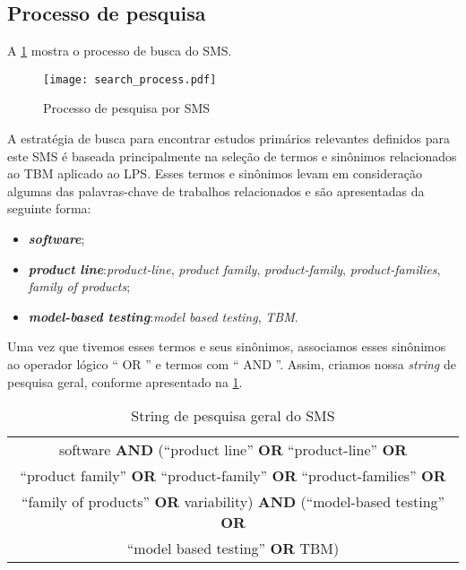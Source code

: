 \subsection{Processo de pesquisa}
\label{sec:search_process}

A \ref{fig:search_process} mostra o processo de busca do SMS.

\begin{figure} [! ht]
	\centering
	\texttt{[image: search\_process.pdf]}
	\caption{Processo de pesquisa por SMS}
	\label{fig:search_process}
\end{figure}

A estratégia de busca para encontrar estudos primários relevantes definidos para este SMS é baseada principalmente na seleção de termos e sinônimos relacionados ao TBM aplicado ao LPS. Esses termos e sinônimos levam em consideração algumas das palavras-chave de trabalhos relacionados e são apresentadas da seguinte forma:

\begin{itemize}
	\item \textbf{\textit{software}};
	\item \textbf{\textit{product line}}:\textit{product-line}, \textit{product family}, \textit{product-family}, \textit{product-families}, \textit{family of products};
	\item \textbf{\textit{model-based testing}}:\textit{model based testing}, \textit{TBM}.
\end{itemize}

Uma vez que tivemos esses termos e seus sinônimos, associamos esses sinônimos ao operador lógico `` OR '' e termos com `` AND ''. Assim, criamos nossa \textit{string} de pesquisa geral, conforme apresentado na \ref{tab:search_string}.

\begin{table}[!ht]	
	\centering
	\caption{String de pesquisa geral do SMS}
	\label{tab:search_string}
	\begin{tabular}{@{}c@{}}	
		\hline			
		software \textbf{AND} (``product line'' \textbf{OR} ``product-line'' \textbf{OR} \\``product family'' \textbf{OR} ``product-family'' \textbf{OR} ``product-families'' \textbf{OR} \\``family of products'' \textbf{OR} variability) \textbf{AND} (``model-based testing'' \textbf{OR} \\``model based testing'' \textbf{OR} TBM)	
		\\\hline
	\end{tabular}
\end{table}

